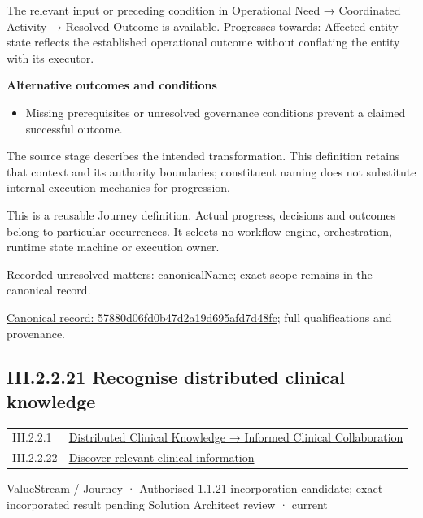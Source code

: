 The relevant input or preceding condition in Operational Need → Coordinated Activity → Resolved Outcome is available. Progresses towards: Affected entity state reflects the established operational outcome without conflating the entity with its executor.



\par\medskip\textbf{Alternative outcomes and conditions}\par


\begin{itemize}


\item Missing prerequisites or unresolved governance conditions prevent a claimed successful outcome.

\end{itemize}


The source stage describes the intended transformation. This definition retains that context and its authority boundaries; constituent naming does not substitute internal execution mechanics for progression.



This is a reusable Journey definition. Actual progress, decisions and outcomes belong to particular occurrences. It selects no workflow engine, orchestration, runtime state machine or execution owner.


{\small Recorded unresolved matters: canonicalName; exact scope remains in the canonical record.}\par
{\footnotesize \href{../../../../continuum/strategy/value-stream/57880d06fd0b47d2a19d695afd7d48fc.md}{Canonical record: 57880d06fd0b47d2a19d695afd7d48fc}; full qualifications and provenance.}\par
\subsection*{III.2.2.21 Recognise distributed clinical knowledge}
\label{navigation:III.2.2.21}

\begin{longtable}{p{.22\linewidth}p{.73\linewidth}}
III.2.2.1 & \hyperref[element:3ba98c0c1170458f8c02fa76694fee67]{Distributed Clinical Knowledge → Informed Clinical Collaboration} \\
III.2.2.22 & \hyperref[element:413213f085b44715a309f39b55ee3ee6]{Discover relevant clinical information} \\
\end{longtable}
\label{element:fc1b52968e944710b41b2a7c3fa53e5b}
{\small ValueStream / Journey · Authorised 1.1.21 incorporation candidate; exact incorporated result pending Solution Architect review · current}\par

